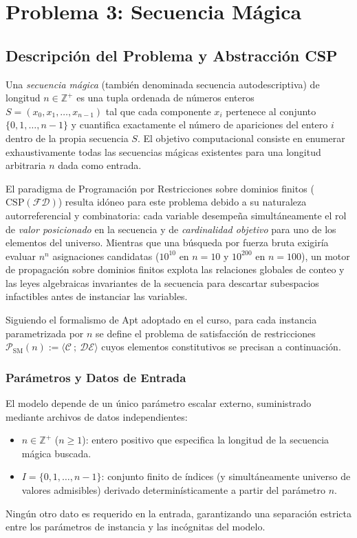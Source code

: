 \section{Problema 3: Secuencia Mágica}
\label{sec:secuencia_magica}

\subsection{Descripción del Problema y Abstracción CSP}

Una \emph{secuencia mágica} (también denominada secuencia autodescriptiva) de longitud $n \in \mathbb{Z}^+$ es una tupla ordenada de números enteros $S = (x_0, x_1, \dots, x_{n-1})$ tal que cada componente $x_i$ pertenece al conjunto $\{0, 1, \dots, n-1\}$ y cuantifica exactamente el número de apariciones del entero $i$ dentro de la propia secuencia $S$. El objetivo computacional consiste en enumerar exhaustivamente todas las secuencias mágicas existentes para una longitud arbitraria $n$ dada como entrada.

El paradigma de Programación por Restricciones sobre dominios finitos ($\text{CSP}(\mathcal{FD})$) resulta idóneo para este problema debido a su naturaleza autorreferencial y combinatoria: cada variable desempeña simultáneamente el rol de \emph{valor posicionado} en la secuencia y de \emph{cardinalidad objetivo} para uno de los elementos del universo. Mientras que una búsqueda por fuerza bruta exigiría evaluar $n^n$ asignaciones candidatas ($10^{10}$ en $n=10$ y $10^{200}$ en $n=100$), un motor de propagación sobre dominios finitos explota las relaciones globales de conteo y las leyes algebraicas invariantes de la secuencia para descartar subespacios infactibles antes de instanciar las variables.

Siguiendo el formalismo de Apt adoptado en el curso, para cada instancia parametrizada por $n$ se define el problema de satisfacción de restricciones $\mathcal{P}_{\text{SM}}(n) := \langle \mathcal{C} \ ; \ \mathcal{DE} \rangle$ cuyos elementos constitutivos se precisan a continuación.

\subsubsection{Parámetros y Datos de Entrada}

El modelo depende de un único parámetro escalar externo, suministrado mediante archivos de datos independientes:
\begin{itemize}
    \item $n \in \mathbb{Z}^+$ ($n \ge 1$): entero positivo que especifica la longitud de la secuencia mágica buscada.
    \item $I = \{0, 1, \dots, n-1\}$: conjunto finito de índices (y simultáneamente universo de valores admisibles) derivado determinísticamente a partir del parámetro $n$.
\end{itemize}
Ningún otro dato es requerido en la entrada, garantizando una separación estricta entre los parámetros de instancia y las incógnitas del modelo.


